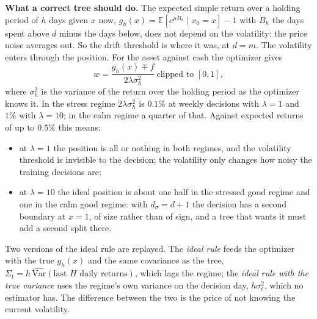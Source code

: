 \documentclass[11pt,a4paper]{article}
\newcommand{\E}{\mathbb{E}}
\newcommand{\1}{\mathbf{1}}
\begin{document}
\textbf{What a correct tree should do.} The expected simple return over a holding period of $h$ days given $x$ now, $g_h(x)=\E[e^{\mu B_h}\mid x_0=x]-1$ with $B_h$ the days spent above $d$ minus the days below, does not depend on the volatility: the price noise averages out. So the drift threshold is where it was, at $d=m$. The volatility enters through the position. For the asset against cash the optimizer gives
\begin{equation}\label{eq:w}
w=\frac{g_h(x)\mp f}{2\lambda\sigma_h^2}\ \text{clipped to }[0,1],
\end{equation}
where $\sigma_h^2$ is the variance of the return over the holding period as the optimizer knows it. In the stress regime $2\lambda\sigma_h^2$ is $0.1\%$ at weekly decisions with $\lambda=1$ and $1\%$ with $\lambda=10$; in the calm regime a quarter of that. Against expected returns of up to $0.5\%$ this means:
\begin{itemize}\setlength{\itemsep}{1pt}
\item at $\lambda=1$ the position is all or nothing in both regimes, and the volatility threshold is invisible to the decision; the volatility only changes how noisy the training decisions are;
\item at $\lambda=10$ the ideal position is about one half in the stressed good regime and one in the calm good regime: with $d_\sigma=d+1$ the decision has a second boundary at $x=1$, of size rather than of sign, and a tree that wants it must add a second split there.
\end{itemize}
Two versions of the ideal rule are replayed. The \emph{ideal rule} feeds the optimizer with the true $g_h(x)$ and the same covariance as the tree, $\Sigma_t=h\,\widehat{\mathrm{Var}}(\text{last }H\text{ daily returns})$, which lags the regime; the \emph{ideal rule with the true variance} uses the regime's own variance on the decision day, $h\sigma_t^2$, which no estimator has. The difference between the two is the price of not knowing the current volatility.
\end{document}
